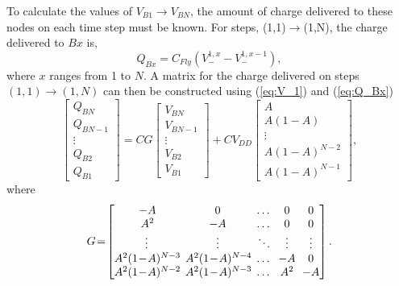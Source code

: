 \documentclass[conference]{IEEEtran}
\begin{document}
	To calculate the values of $V_{B1}\rightarrow V_{BN}$, the amount of charge delivered to these nodes on each time step must be known. For steps, (1,1)$\rightarrow $(1,N), the charge delivered to $Bx$ is,
	\begin{equation}
	Q_{Bx} = C_{Fly}(V_-^{1,x} - V_-^{1,x-1}),
	\label{eq:Q_Bx}
	\end{equation}
	where $x$ ranges from 1 to $N$. A matrix for the charge delivered on steps $(1,1)\rightarrow(1,N)$ can then be constructed using (\ref{eq:V_1}) and (\ref{eq:Q_Bx})
	\begin{equation}
	\begin{bmatrix}
	Q_{BN} \\
	Q_{BN-1} \\
	\vdots\\
	Q_{B2} \\ 
	Q_{B1}
	\end{bmatrix}\!
	= \!
	CG\!\begin{bmatrix}
	V_{BN} \\
	V_{BN-1} \\
	\vdots \\
	V_{B2} \\
	V_{B1}
	\end{bmatrix}\!+ \!CV_{DD}\!\begin{bmatrix}
	A \\
	A(1-A) \\
	\vdots \\
	A(1\!-\!A)^{N-2} \\
	A(1\!-\!A)^{N-1}
	\end{bmatrix},
	\label{eq:Q_V1}
	\end{equation}	
	where
	\begin{equation}
	G\!=\!	
	\arraycolsep3pt 
	\begin{bmatrix}
	-A \!& 0 & \dots & 0 & 0 \\
	A^2 \!& -A & \dots & 0 & 0\\
	\vdots & \vdots & \ddots & \vdots & \vdots \\
	A^2(1\!-\!A)^{N-3} \!& A^2(1\!-\!A)^{N-4} \!& \dots & -A & 0\\ 
	A^2(1\!-\!A)^{N-2} \!& A^2(1\!-\!A)^{N-3} \!& \dots & A^2 & -A 
	\end{bmatrix}.
	\end{equation}
	
\end{document}
